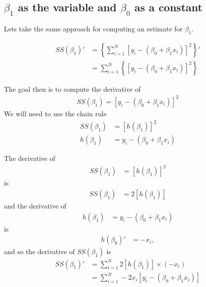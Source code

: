 \subsection{ $\beta_{1}$ as the variable and $\beta_{0}$ as a constant}

Lets take the same approach for computing an estimate for $\beta_{1}$.

\begin{align}
    SS(\beta_{1})' &= \left\{ \sum_{i=1}^{N} \left[ y_{i} - \left(\beta_{0} + \beta_{1}x_{i} \right)  \right]^{2} \right \}' \\
    &=  \sum_{i=1}^{N} \left\{ \left[ y_{i} - \left(\beta_{0} + \beta_{1}x_{i} \right)   \right]^{2}\right \}
\end{align}

The goal then is to compute the derivative of 
\begin{align}
    SS(\beta_{1}) = \left[ y_{i} - \left(\beta_{0} + \beta_{1}x_{i} \right)  \right]^{2}
\end{align}
We will need to use the chain rule
\begin{align}
    SS(\beta_{1}) &= \left[ h(\beta_{1}) \right]^{2} \\ 
    h(\beta_{1}) &= y_{i} - \left(\beta_{0} + \beta_{1}x_{i} \right)
\end{align}

The derivative of 
\begin{align}
    SS(\beta_{1}) &= \left[ h(\beta_{1}) \right]^{2}
\end{align}
is 
\begin{align}
    SS(\beta_{1}) &= 2\left[ h(\beta_{1}) \right] 
\end{align} and the derivative of 
\begin{align}
    h(\beta_{1}) &= y_{i} - \left(\beta_{0} + \beta_{1}x_{i} \right) 
\end{align}
is 
\begin{align}
    h(\beta_{0})' &= -x_{i},
\end{align}
and so the derivative of $SS(\beta_{1})$ is 
\begin{align}
    SS(\beta_{1})' &= \sum_{i=1}^{N} 2\left[ h(\beta_{1}) \right] \times (-x_{i}) \\ 
                   &= \sum_{i=1}^{N} -2x_{i}\left[y_{i} - \left(\beta_{0} + \beta_{1}x_{i} \right) \right]
\end{align}

